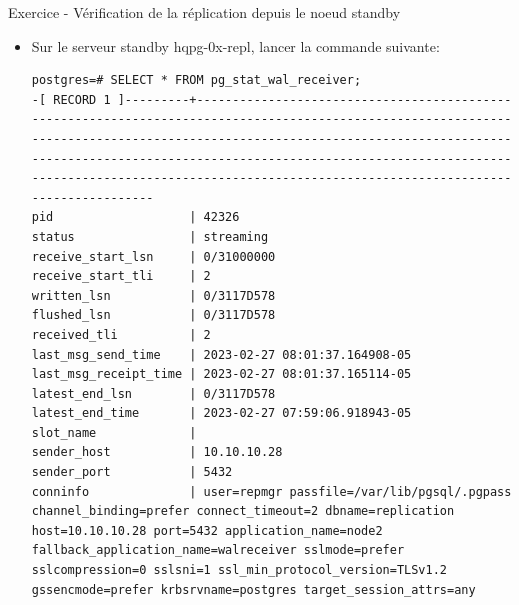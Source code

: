 \begin{frame}[fragile]{Exercice - Vérification de la réplication depuis le noeud standby}

   \begin{itemize}
      \item Sur le serveur standby hqpg-0x-repl, lancer la commande suivante:
\begin{tiny}
\begin{Verbatim}[commandchars=\&\{\}]
postgres=# SELECT * FROM pg_stat_wal_receiver;
-[ RECORD 1 ]---------+-----------------------------------------------------------------------------------------------------------------------------------------------------------------------------------------------------------------------------------------------------------------------------------------------------------------------------------------                           
pid                   | 42326
status                | streaming
receive_start_lsn     | 0/31000000
receive_start_tli     | 2
written_lsn           | 0/3117D578
flushed_lsn           | 0/3117D578
received_tli          | 2
last_msg_send_time    | 2023-02-27 08:01:37.164908-05
last_msg_receipt_time | 2023-02-27 08:01:37.165114-05
latest_end_lsn        | 0/3117D578
latest_end_time       | 2023-02-27 07:59:06.918943-05
slot_name             |
sender_host           | 10.10.10.28
sender_port           | 5432
conninfo              | user=repmgr passfile=/var/lib/pgsql/.pgpass channel_binding=prefer connect_timeout=2 dbname=replication host=10.10.10.28 port=5432 application_name=node2 fallback_application_name=walreceiver sslmode=prefer sslcompression=0 sslsni=1 ssl_min_protocol_version=TLSv1.2 gssencmode=prefer krbsrvname=postgres target_session_attrs=any                           
\end{Verbatim}
\end{tiny}
   \end{itemize}

\end{frame}


